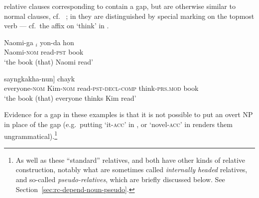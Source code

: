 \documentclass[output=paper,biblatex,babelshorthands,newtxmath,draftmode,colorlinks,citecolor=brown]{langscibook}
\begin{document}
relative clauses corresponding to  contain a gap, but are otherwise similar to
normal clauses, cf.\  \citep[from][18]{SiraiGunjiRelative}; in  they are
distinguished by special marking on the topmost verb --- cf.\ the  affix on
 `think' in 
\citep[from][285]{Kim16SyntacticStrKorean}.
\begin{exe}\ex\label{x:rc-81}
\gll Naomi-ga \trace{}$_i$ yon-da hon\\
     Naomi-\textsc{nom} {} read-\textsc{pst} book\\
\glt `the book (that) Naomi read'
\end{exe}
\begin{exe}\ex\label{x:rc-82}
\gll [motwu-ka           [Kim-i       \trace{}\subscr{i} ilk-ess-ta-ko]  sayngkakha-nun] chayk \\
      \hphantom{[}everyone-\textsc{nom} \hphantom{[}Kim-\textsc{nom}  {}     read-\textsc{pst-decl-comp} think-\textsc{prs.mod}   book\\
\glt `the book (that) everyone thinks Kim read'  
\end{exe}
Evidence for a gap in these examples is that it is not possible to put an overt NP in
place of the gap (e.g.\ putting  `it-\textsc{acc}' in , or
 `novel-\textsc{acc}' in  renders them ungrammatical).\footnote{As
  well as these ``standard'' relatives,  and  both have other kinds of
  relative construction, notably what are sometimes called \emph{internally headed} relatives, and so-called
  \emph{pseudo-relatives}, which are briefly discussed below. See
  Section~\ref{sec:rc-depend-noun-pseudo}.}
\end{document}
